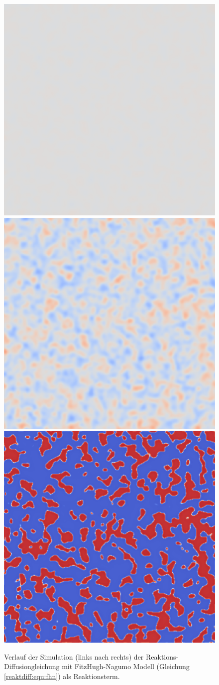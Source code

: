 \begin{figure}
    \centering
    \includegraphics[width=0.32\linewidth]{papers/reaktdiff/images/FitzHughNagumo/fhn_n1.png}
    \includegraphics[width=0.32\linewidth]{papers/reaktdiff/images/FitzHughNagumo/fhn_n300.png}
    \includegraphics[width=0.32\linewidth]{papers/reaktdiff/images/FitzHughNagumo/fhn_n999.png}
    \caption{Verlauf der Simulation (links nach rechts) der Reaktions-Diffusiongleichung mit FitzHugh-Nagumo Modell (Gleichung \eqref{reaktdiff:equ:fhn}) als Reaktionsterm.}
    \label{reaktdiff:fig:fhn}
\end{figure}